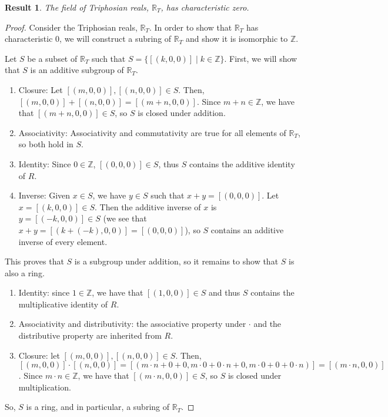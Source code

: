\documentclass[11pt]{article}
\newcommand{\Tri}{\mathbb{R}_T}
\theoremstyle{definition}
\theoremstyle{plain}
\newtheorem{result}{Result}
\theoremstyle{remark}
\begin{document}
	\begin{result}
		The field of Triphosian reals, \(\Tri\), has characteristic zero.
	\end{result}
	\begin{proof}
		Consider the Triphosian reals, \(\Tri\). In order to show that \(\Tri\)
		has characteristic 0, we will construct a subring of \(\Tri\) and show
		it is isomorphic to \(\mathbb{Z}\).

		Let \(S\) be a subset of \(\Tri\) such that \(S = \{[(k,0,0)]\mid k \in
		\mathbb{Z}\}\). First, we will show that \(S\) is an additive subgroup
		of \(\Tri\).
		\begin{enumerate}
			\item Closure: Let \([(m,0,0)],[(n,0,0)] \in S\). Then, \([(m,0,0)]
			+ [(n,0,0)] = [(m+n,0,0)]\). Since \(m+n \in \mathbb{Z}\), we have
			that \([(m+n,0,0)] \in S\), so \(S\) is closed under addition.
			\item Associativity: Associativity and commutativity are true for
			all elements of \(\Tri\), so both hold in \(S\).
			\item Identity: Since \(0 \in \mathbb{Z}\), \([(0,0,0)] \in S\),
			thus \(S\) contains the additive identity of \(R\).
			\item Inverse: Given \(x \in S\), we have \(y \in S\) such that \(x
			+ y = [(0,0,0)]\). Let \(x = [(k,0,0)] \in S\). Then the additive
			inverse of \(x\) is \(y = [(-k,0,0)] \in S\) (we see that \(x + y =
			[(k + (-k),0,0)] = [(0,0,0)]\)), so \(S\) contains an additive
			inverse of every element.
		\end{enumerate}

		This proves that \(S\) is a subgroup under addition, so it remains to
		show that \(S\) is also a ring.
		\begin{enumerate}
			\item Identity: since \(1 \in \mathbb{Z}\), we have that
			\([(1,0,0)] \in S\) and thus \(S\) contains the multiplicative
			identity of \(R\).
			\item Associativity and distributivity: the associative property
			under \(\cdot\) and the distributive property are inherited from
			\(R\).
			\item Closure: let \([(m,0,0)], [(n,0,0)] \in S\). Then,
			\([(m,0,0)]\cdot[(n,0,0)] = [(m\cdot n + 0 + 0, m\cdot 0 + 0\cdot n
			+ 0, m \cdot 0 + 0 + 0 \cdot n)] = [(m\cdot n,0,0)]\). Since \(m
			\cdot n \in \mathbb{Z}\), we have that \([(m\cdot n,0,0)] \in S\),
			so \(S\) is closed under multiplication.
		\end{enumerate}
		So, \(S\) is a ring, and in particular, a subring of \(\Tri\).


\end{proof}
\end{document}
